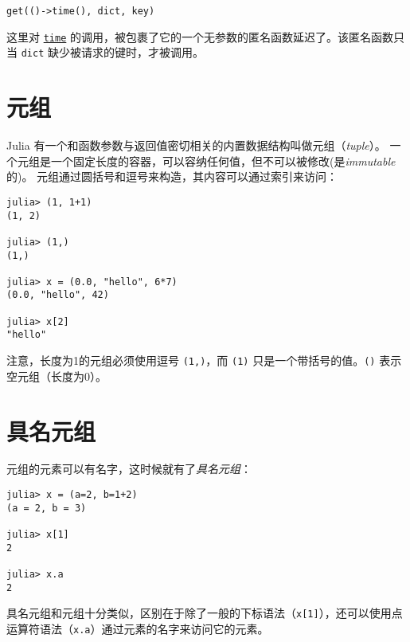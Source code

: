 \begin{verbatim}
get(()->time(), dict, key)
\end{verbatim}



这里对 \hyperlink{2441622941271736623}{\texttt{time}} 的调用，被包裹了它的一个无参数的匿名函数延迟了。该匿名函数只当 \texttt{dict} 缺少被请求的键时，才被调用。



\hypertarget{9218398227562398910}{}


\section{元组}



Julia 有一个和函数参数与返回值密切相关的内置数据结构叫做元组（\emph{tuple}）。 一个元组是一个固定长度的容器，可以容纳任何值，但不可以被修改(是\emph{immutable}的)。 元组通过圆括号和逗号来构造，其内容可以通过索引来访问：




\begin{verbatim}
julia> (1, 1+1)
(1, 2)

julia> (1,)
(1,)

julia> x = (0.0, "hello", 6*7)
(0.0, "hello", 42)

julia> x[2]
"hello"
\end{verbatim}



注意，长度为1的元组必须使用逗号 \texttt{(1,)}，而 \texttt{(1)} 只是一个带括号的值。\texttt{()} 表示空元组（长度为0）。



\hypertarget{14936898299796428859}{}


\section{具名元组}



元组的元素可以有名字，这时候就有了\emph{具名元组}：




\begin{verbatim}
julia> x = (a=2, b=1+2)
(a = 2, b = 3)

julia> x[1]
2

julia> x.a
2
\end{verbatim}



具名元组和元组十分类似，区别在于除了一般的下标语法（\texttt{x[1]}），还可以使用点运算符语法（\texttt{x.a}）通过元素的名字来访问它的元素。



